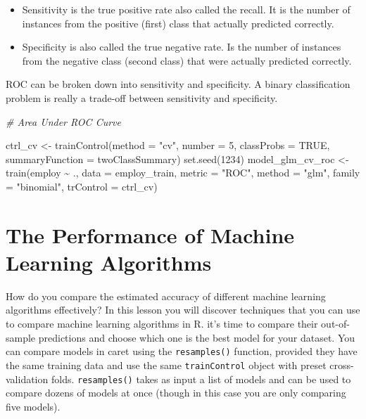 \documentclass[
]{book}
\newenvironment{Shaded}{\begin{snugshade}}{\end{snugshade}}
\newcommand{\AttributeTok}[1]{\textcolor[rgb]{0.77,0.63,0.00}{#1}}
\newcommand{\CommentTok}[1]{\textcolor[rgb]{0.56,0.35,0.01}{\textit{#1}}}
\newcommand{\ConstantTok}[1]{\textcolor[rgb]{0.00,0.00,0.00}{#1}}
\newcommand{\DecValTok}[1]{\textcolor[rgb]{0.00,0.00,0.81}{#1}}
\newcommand{\FunctionTok}[1]{\textcolor[rgb]{0.00,0.00,0.00}{#1}}
\newcommand{\NormalTok}[1]{#1}
\newcommand{\OtherTok}[1]{\textcolor[rgb]{0.56,0.35,0.01}{#1}}
\newcommand{\SpecialCharTok}[1]{\textcolor[rgb]{0.00,0.00,0.00}{#1}}
\newcommand{\StringTok}[1]{\textcolor[rgb]{0.31,0.60,0.02}{#1}}
\providecommand{\tightlist}{%
  \setlength{\itemsep}{0pt}\setlength{\parskip}{0pt}}
\begin{document}
\begin{itemize}
\tightlist
\item
  Sensitivity is the true positive rate also called the recall. It is the number of instances from the positive (first) class that actually predicted correctly.
\item
  Specificity is also called the true negative rate. Is the number of instances from the negative class (second class) that were actually predicted correctly.
\end{itemize}

ROC can be broken down into sensitivity and specificity. A binary classification problem is really a trade-off between sensitivity and specificity.

\begin{Shaded}
\begin{Highlighting}[]
\CommentTok{\# Area Under ROC Curve}

\NormalTok{ctrl\_cv }\OtherTok{\textless{}{-}} \FunctionTok{trainControl}\NormalTok{(}\AttributeTok{method =} \StringTok{"cv"}\NormalTok{, }\AttributeTok{number =} \DecValTok{5}\NormalTok{, }\AttributeTok{classProbs =} \ConstantTok{TRUE}\NormalTok{,}
                        \AttributeTok{summaryFunction =}\NormalTok{ twoClassSummary)}
\FunctionTok{set.seed}\NormalTok{(}\DecValTok{1234}\NormalTok{)}
\NormalTok{model\_glm\_cv\_roc }\OtherTok{\textless{}{-}} \FunctionTok{train}\NormalTok{(employ }\SpecialCharTok{\textasciitilde{}}\NormalTok{ .,}
                      \AttributeTok{data =}\NormalTok{ employ\_train,}
                      \AttributeTok{metric =} \StringTok{"ROC"}\NormalTok{,}
                      \AttributeTok{method =} \StringTok{"glm"}\NormalTok{, }\AttributeTok{family =} \StringTok{"binomial"}\NormalTok{,}
                      \AttributeTok{trControl =}\NormalTok{ ctrl\_cv)}
\end{Highlighting}
\end{Shaded}

\hypertarget{the-performance-of-machine-learning-algorithms}{%
\section{The Performance of Machine Learning Algorithms}\label{the-performance-of-machine-learning-algorithms}}

How do you compare the estimated accuracy of different machine learning algorithms effectively?
In this lesson you will discover techniques that you can use to compare machine learning algorithms in R.
it's time to compare their out-of-sample predictions and choose which one is the best model for your dataset.
You can compare models in caret using the \texttt{resamples()} function, provided they have the same training data and use the same \texttt{trainControl} object with preset cross-validation folds. \texttt{resamples()} takes as input a list of models and can be used to compare dozens of models at once (though in this case you are only comparing five models).
\end{document}
